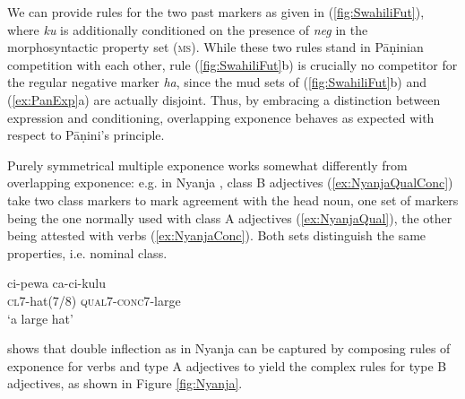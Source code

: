 We can provide rules for the two past markers as given in
(\ref{fig:SwahiliFut}), where \textit{ku} is additionally conditioned
on the presence of \textit{neg} in the morphosyntactic property set
(\textsc{ms}). While these two rules stand in Pāṇinian competition
with each other, rule (\ref{fig:SwahiliFut}b) is crucially no
competitor for the regular negative marker \textit{ha}, since the
\textup{mud} sets of (\ref{fig:SwahiliFut}b) and (\ref{ex:PanExp}a)
are actually disjoint. Thus, by embracing a distinction between
expression and conditioning, overlapping exponence behaves as expected
with respect to Pāṇini's principle.


Purely symmetrical multiple exponence works somewhat differently from
overlapping exponence: e.g. in Nyanja \citep{Stump01,Crysmann:14:OUP},
class B adjectives (\ref{ex:NyanjaQualConc}) take two class markers to
mark agreement with the head noun, one set of markers being the one
normally used with class A adjectives (\ref{ex:NyanjaQual}), the other being attested with
verbs (\ref{ex:NyanjaConc}). Both sets distinguish the same
properties, i.e. nominal class. \label{Nyanja}

\begin{exe}
  \ex \label{ex:NyanjaQualConc}
     {\gll ci-pewa ca-ci-kulu\\
    \textsc{cl7}-hat(7/8) \textsc{qual7}-\textsc{conc7}-large\\
    \glt `a large hat'}
\end{exe}

\citet{Crysmann:14:OUP} shows that double inflection as in Nyanja
can be captured by composing rules of exponence for verbs and type A
adjectives to yield the complex rules for type B adjectives, as shown
in Figure \ref{fig:Nyanja}. 

